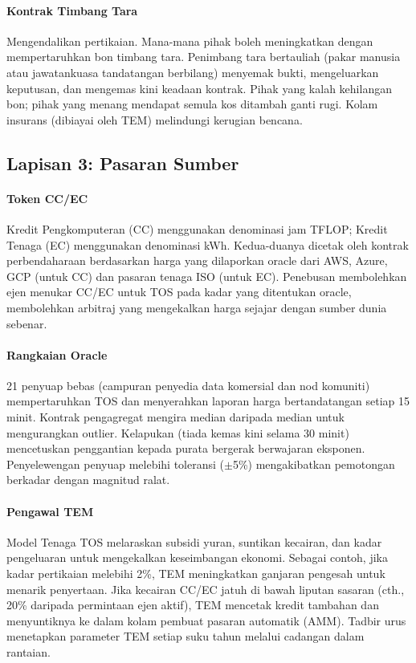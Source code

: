 \documentclass[11pt]{article}
\begin{document}
\paragraph{Kontrak Timbang Tara} Mengendalikan pertikaian. Mana-mana pihak boleh meningkatkan dengan mempertaruhkan bon timbang tara. Penimbang tara bertauliah (pakar manusia atau jawatankuasa tandatangan berbilang) menyemak bukti, mengeluarkan keputusan, dan mengemas kini keadaan kontrak. Pihak yang kalah kehilangan bon; pihak yang menang mendapat semula kos ditambah ganti rugi. Kolam insurans (dibiayai oleh TEM) melindungi kerugian bencana.

\subsection{Lapisan 3: Pasaran Sumber}
\paragraph{Token CC/EC} Kredit Pengkomputeran (CC) menggunakan denominasi jam TFLOP; Kredit Tenaga (EC) menggunakan denominasi kWh. Kedua-duanya dicetak oleh kontrak perbendaharaan berdasarkan harga yang dilaporkan oracle dari AWS, Azure, GCP (untuk CC) dan pasaran tenaga ISO (untuk EC). Penebusan membolehkan ejen menukar CC/EC untuk TOS pada kadar yang ditentukan oracle, membolehkan arbitraj yang mengekalkan harga sejajar dengan sumber dunia sebenar.

\paragraph{Rangkaian Oracle} 21 penyuap bebas (campuran penyedia data komersial dan nod komuniti) mempertaruhkan TOS dan menyerahkan laporan harga bertandatangan setiap 15 minit. Kontrak pengagregat mengira median daripada median untuk mengurangkan outlier. Kelapukan (tiada kemas kini selama 30 minit) mencetuskan penggantian kepada purata bergerak berwajaran eksponen. Penyelewengan penyuap melebihi toleransi ($\pm$5\%) mengakibatkan pemotongan berkadar dengan magnitud ralat.

\paragraph{Pengawal TEM} Model Tenaga TOS melaraskan subsidi yuran, suntikan kecairan, dan kadar pengeluaran untuk mengekalkan keseimbangan ekonomi. Sebagai contoh, jika kadar pertikaian melebihi 2\%, TEM meningkatkan ganjaran pengesah untuk menarik penyertaan. Jika kecairan CC/EC jatuh di bawah liputan sasaran (cth., 20\% daripada permintaan ejen aktif), TEM mencetak kredit tambahan dan menyuntiknya ke dalam kolam pembuat pasaran automatik (AMM). Tadbir urus menetapkan parameter TEM setiap suku tahun melalui cadangan dalam rantaian.
\end{document}
